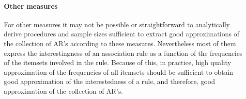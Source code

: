 \paragraph{Other measures}
For other measures it may not be possible or straightforward to analytically derive
procedures and sample sizes sufficient to extract good approximations of the
collection of AR's according to these measures. Nevertheless most of them
express the interestingness of an association rule as a function of the
frequencies of the itemsets involved in the rule. Because of this, in practice,
 high quality approximation of the frequencies of all itemsets should be
sufficient to obtain good approximation of the interestedness of a rule, and
therefore, good approximation of the collection of AR's.

